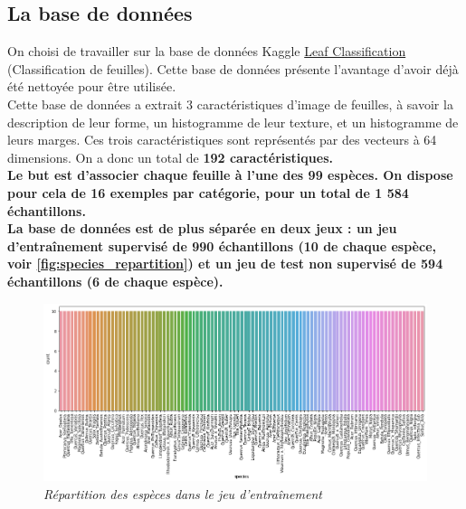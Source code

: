 \subsection{La base de données}

On choisi de travailler sur la base de données Kaggle \href{https://www.kaggle.com/competitions/leaf-classification}{Leaf Classification} (Classification de feuilles). Cette base de données présente l'avantage d'avoir déjà été nettoyée pour être utilisée.\\

Cette base de données a extrait 3 caractéristiques d'image de feuilles, à savoir la description de leur forme, un histogramme de leur texture, et un histogramme de leurs marges. Ces trois caractéristiques sont représentés par des vecteurs à 64 dimensions. On a donc un total de \bf{192 caractéristiques}.\\

Le but est d'associer chaque feuille à l'une des \bf{99 espèces}. On dispose pour cela de 16 exemples par catégorie, pour un total de \bf{1 584 échantillons}.\\

La base de données est de plus séparée en deux jeux : un jeu d'entraînement supervisé de \bf{990 échantillons} (10 de chaque espèce, voir     \autoref{fig:species_repartition}) et un jeu de test non supervisé de \bf{594 échantillons} (6 de chaque espèce).

\begin{figure}[h]
    \centering
    \includegraphics[scale=0.48]{Images/graphiques/species_repartition.png}
    \caption{\it{Répartition des espèces dans le jeu d'entraînement}}
    \label{fig:species_repartition}
\end{figure}